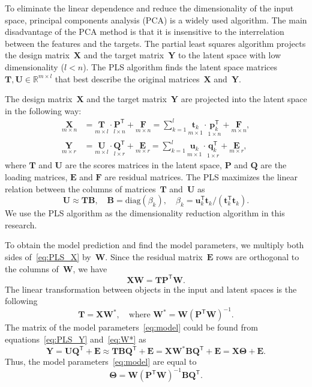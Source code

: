 \documentclass[12pt,twoside]{article}
\theoremstyle{definition}
\newcommand{\bY}{\mathbf{Y}}
\newcommand{\bX}{\mathbf{X}}
\newcommand{\bu}{\mathbf{u}}
\newcommand{\bt}{\mathbf{t}}
\newcommand{\bp}{\mathbf{p}}
\newcommand{\bq}{\mathbf{q}}
\newcommand{\bP}{\mathbf{P}}
\newcommand{\bT}{\mathbf{T}}
\newcommand{\bB}{\mathbf{B}}
\newcommand{\bQ}{\mathbf{Q}}
\newcommand{\bE}{\mathbf{E}}
\newcommand{\bF}{\mathbf{F}}
\newcommand{\bU}{\mathbf{U}}
\newcommand{\bW}{\mathbf{W}}
\newcommand{\T}{\mathsf{T}}
\newcommand{\bTheta}{\boldsymbol{\Theta}}
\begin{document}
To eliminate the linear dependence and reduce the dimensionality of the input space, principal components analysis (PCA) is a widely used algorithm. 
The main disadvantage of the PCA method is that it is insensitive to the interrelation between the features and the targets.
The partial least squares algorithm projects the design matrix~$\bX$ and the target matrix~$\bY$ to the latent space with low dimensionality ($l < n$).
The PLS algorithm finds the latent space matrices $\bT, \bU \in \mathbb{R}^{m \times l}$ that best describe the original matrices~$\bX$ and~$\bY$.

The design matrix~$\bX$ and the target matrix~$\bY$ are projected into the latent space in the following way:
\begin{align}
\label{eq:PLS_X}
\underset{m \times n}{\bX} 
&= \underset{m \times l}{\bT} \cdot \underset{l \times n}{\bP^{\T}} + \underset{m \times n}{\bF} 
= \sum_{k=1}^l \underset{m \times 1}{\bt_k} \cdot \underset{1 \times n}{\bp_k^{\T}} + \underset{m \times n}{\bF},\\
\label{eq:PLS_Y}
\underset{m \times r}{\bY} 
&= \underset{m \times l}{\bU} \cdot \underset{l \times r}{\bQ^{\T}} + \underset{m \times r}{\bE}
=  \sum_{k=1}^l  \underset{m \times 1}{\bu_k} \cdot \underset{1 \times r}{\bq_k^{\T}} +  \underset{m \times r}{\bE},
\end{align}
where $\bT$ and $\bU$ are the scores matrices in the latent space, $\bP$ and $\bQ$ are the loading matrices, $\bE$ and $\bF$ are residual matrices. The PLS maximizes the linear relation between the columns of matrices~$\bT$ and~$\bU$ as
\begin{equation*}
\bU \approx \bT \bB, \quad \bB = \text{diag}(\beta_k), \quad \beta_k = \bu_k^{\T}\bt_k / (\bt_k^{\T}\bt_k).
\end{equation*}
We use the PLS algorithm as the dimensionality reduction algorithm in this research.

To obtain the model prediction and find the model parameters, we multiply both sides of~\eqref{eq:PLS_X} by~$\bW$. 
Since the residual matrix~$\bE$ rows are orthogonal to the columns of~$\bW$, we have
\begin{equation*}
\bX \bW = \bT \bP^{\T} \bW.
\end{equation*}
The linear transformation between objects in the input and latent spaces is the following
\begin{equation}
\bT = \bX \bW^*, \quad \text{where } \bW^* = \bW (\bP^{\T} \bW)^{-1}.
\label{eq:W*}
\end{equation}
The matrix of the model parameters~\eqref{eq:model} could be found from equations~\eqref{eq:PLS_Y} and~\eqref{eq:W*} as
\begin{equation}
\bY = \bU \bQ^{\T} + \bE \approx \bT \bB \bQ^{\T}+ \bE = \bX \bW^* \bB \bQ^{\T} + \bE = \bX \bTheta + \bE.
\label{eq:pls_model}
\end{equation}
Thus, the model parameters~\eqref{eq:model} are equal to
\begin{equation*}
\bTheta = \bW (\bP^{\T} \bW)^{-1} \bB \bQ^{\T}.
\end{equation*}
\end{document}
